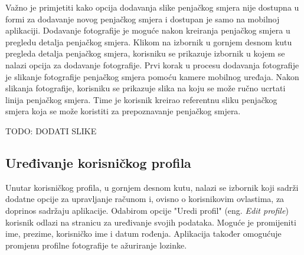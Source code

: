 Važno je primjetiti kako opcija dodavanja slike penjačkog smjera nije dostupna u formi za dodavanje novog penjačkog smjera i dostupan je samo na mobilnoj aplikaciji. Dodavanje fotografije je moguće nakon kreiranja penjačkog smjera u pregledu detalja penjačkog smjera. Klikom na izbornik u gornjem desnom kutu pregleda detalja penjačkog smjera, korisniku se prikazuje izbornik u kojem se nalazi opcija za dodavanje fotografije. Prvi korak u procesu dodavanja fotografije je slikanje fotografije penjačkog smjera pomoću kamere mobilnog uređaja. Nakon slikanja fotografije, korisniku se prikazuje slika na koju se može ručno ucrtati linija penjačkog smjera. Time je korisnik kreirao referentnu sliku penjačkog smjera koja se može koristiti za prepoznavanje penjačkog smjera.

TODO: DODATI SLIKE

\subsection{Uređivanje korisničkog profila}

Unutar korisničkog profila, u gornjem desnom kutu, nalazi se izbornik koji sadrži dodatne opcije za upravljanje računom i, ovisno o korisnikovim ovlastima, za doprinos sadržaju aplikacije. Odabirom opcije "Uredi profil" (eng. \textit{Edit profile}) korisnik odlazi na stranicu za uređivanje svojih podataka. Moguće je promijeniti ime, prezime, korisničko ime i datum rođenja. Aplikacija također omogućuje promjenu profilne fotografije te ažuriranje lozinke.

